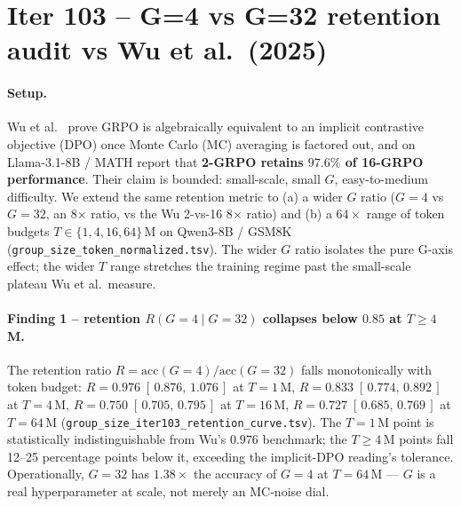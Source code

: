 \section{Iter 103 -- G=4 vs G=32 retention audit vs Wu et al.\ (2025)}
\label{sec:group-size-iter103}

\paragraph{Setup.}
Wu et al.~\cite{wu2025grpo_dpo} prove GRPO is algebraically equivalent
to an implicit contrastive objective (DPO) once Monte Carlo (MC)
averaging is factored out, and on Llama-3.1-8B / MATH report that
\textbf{2-GRPO retains $97.6\%$ of 16-GRPO performance}.  Their claim
is bounded: small-scale, small $G$, easy-to-medium difficulty.  We
extend the same retention metric to (a) a wider $G$ ratio
($G{=}4$ vs $G{=}32$, an 8$\times$ ratio, vs the Wu 2-vs-16 8$\times$
ratio) and (b) a $64\times$ range of token budgets
$T \in \{1,4,16,64\}\,$M on Qwen3-8B / GSM8K
(\texttt{group\_size\_token\_normalized.tsv}).  The wider $G$ ratio
isolates the pure G-axis effect; the wider $T$ range stretches the
training regime past the small-scale plateau Wu et al.\ measure.

\paragraph{Finding 1 -- retention $R(G{=}4\mid G{=}32)$ collapses
below $0.85$ at $T{\ge}4\,$M.}
The retention ratio $R = \mathrm{acc}(G{=}4) / \mathrm{acc}(G{=}32)$
falls monotonically with token budget:
$R = 0.976\;[\,0.876,\,1.076\,]$ at $T{=}1\,$M,
$R = 0.833\;[\,0.774,\,0.892\,]$ at $T{=}4\,$M,
$R = 0.750\;[\,0.705,\,0.795\,]$ at $T{=}16\,$M,
$R = 0.727\;[\,0.685,\,0.769\,]$ at $T{=}64\,$M
(\texttt{group\_size\_iter103\_retention\_curve.tsv}).  The $T{=}1\,$M
point is statistically indistinguishable from Wu's $0.976$ benchmark;
the $T{\ge}4\,$M points fall 12--25 percentage points below it,
exceeding the implicit-DPO reading's tolerance.  Operationally,
$G{=}32$ has $1.38\times$ the accuracy of $G{=}4$ at $T{=}64\,$M ---
$G$ is a real hyperparameter at scale, not merely an MC-noise dial.


